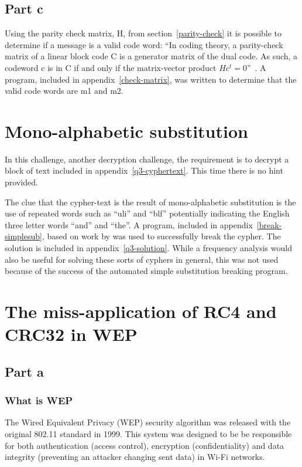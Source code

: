 \documentclass[pdftex, 11pt, a4paper]{article}
\begin{document}
\subsection{Part c}
Using the parity check matrix, H, from section~\ref{parity-check} it is possible
to determine if a message is a valid code word: ``In coding theory, a
parity-check matrix of a linear block code C is a generator matrix of the dual
code. As such, a codeword c is in C if and only if the matrix-vector product
$Hc^t = 0$''~\cite{check-matrix}. A program, included in
appendix~\ref{check-matrix}, was written to determine that the valid code words
are m1 and m2.

\section{Mono-alphabetic substitution}\label{mono}
In this challenge, another decryption challenge, the requirement is to decrypt a
block of text included in appendix~\ref{q3-cyphertext}. This time there is no
hint provided.

The clue that the cypher-text is the result of mono-alphabetic
substitution is the use of repeated words such as ``uli'' and ``blf''
potentially indicating the English three letter words ``and'' and ``the''.
A program, included in appendix~\ref{break-simplesub}, based on work by
\textcite{stochastic-searching} was used to successfully break the cypher.
The solution is included in appendix~\ref{q3-solution}.
While a frequency analysis would also be useful for solving these sorts of cyphers in
general, this was not used because of the success of the automated simple
substitution breaking program.

\section{The miss-application of RC4 and CRC32 in WEP}\label{conclusions}
\subsection{Part a}
\subsubsection{What is WEP}
The Wired Equivalent Privacy (WEP) security algorithm was released with the original 802.11 standard in 1999\cite{802.11}. This system was designed to be be responsible for both authentication (access control), encryption (confidentiality) and data integrity (preventing an attacker changing sent data) in Wi-Fi networks.
\end{document}
